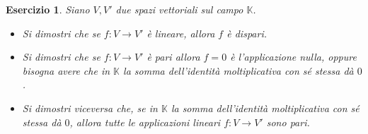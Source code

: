 \documentclass{article}
\newtheorem{es}{Esercizio}
\begin{document}
{\begin{es}
    Siano $V,V'$ due spazi vettoriali sul campo $\mathbb{K}$.
    \begin{itemize}
        \item Si dimostri che se $f:V\to V'$ è lineare, allora $f$ è dispari.
        \item Si dimostri che se $f:V\to V'$ è pari allora $f=0$ è l'applicazione nulla, oppure bisogna avere che in $\mathbb{K}$ la somma dell'identità moltiplicativa con sé stessa dà $0$.
        \item Si dimostri viceversa che, se in $\mathbb{K}$ la somma dell'identità moltiplicativa con sé stessa dà $0$, allora tutte le applicazioni lineari $f:V\to V'$ sono pari.
        
    \end{itemize}
\end{es}









}
\end{document}
